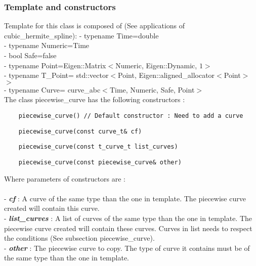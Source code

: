 \documentclass{article}
\begin{document}
    \subsubsection{Template and constructors}

    Template for this class is composed of (See applications of cubic\_hermite\_spline):
    - typename Time=double\\
    - typename Numeric=Time\\
    - bool Safe=false\\
    - typename Point=Eigen::Matrix$<$Numeric, Eigen::Dynamic, $1>$\\
    - typename T\_Point= std::vector$<$Point, Eigen::aligned\_allocator$<$Point$>$ $>$\\
    - typename Curve= curve\_abc$<$Time, Numeric, Safe, Point$>$\\

    \noindent
    The class piecewise\_curve has the following constructors :
    \begin{lstlisting}
    piecewise_curve() // Default constructor : Need to add a curve
    \end{lstlisting}
    \begin{lstlisting}
    piecewise_curve(const curve_t& cf)
    \end{lstlisting}
    \begin{lstlisting}
    piecewise_curve(const t_curve_t list_curves)
    \end{lstlisting}
    \begin{lstlisting}
    piecewise_curve(const piecewise_curve& other)
    \end{lstlisting}

    \noindent
    Where parameters of constructors are :\\\\
    - \textbf{\textit{cf}} : A curve of the same type than the one in template. The piecewise curve created will contain this curve.\\
    - \textbf{\textit{list\_curves}} : A list of curves of the same type than the one in template. The piecewise curve created will contain these curves. Curves in list needs to respect the conditions (See subsection piecewise\_curve).\\
    - \textbf{\textit{other}} : The piecewise curve to copy. The type of curve it contains must be of the same type than the one in template.\\\\
\end{document}
